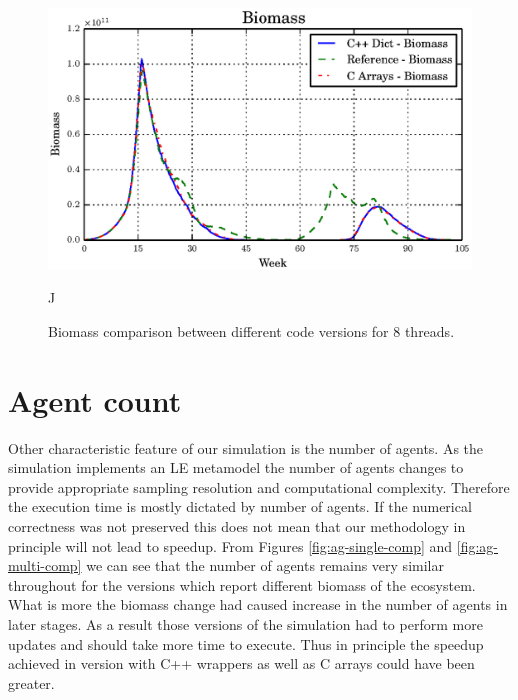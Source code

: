 \documentclass[12pt, a4paper]{report}
\begin{document}
\begin{figure}[H]
  \begin{center}
    \includegraphics[width=\columnwidth]{graphs/bio-multi-comp.eps}
    \caption{Biomass comparison between different code versions for 8 threads.}J
    \label{fig:bio-multi-comp}
  \end{center}
\end{figure}

\section{Agent count}\label{subsec:model-correct-agent}
Other characteristic feature of our simulation is the number of agents. As the
simulation implements an LE metamodel the number of agents changes to provide
appropriate sampling resolution and computational complexity. Therefore the
execution time is mostly dictated by number of agents. If the numerical
correctness was not preserved this does not mean that our methodology in
principle will not lead to speedup. From Figures \ref{fig:ag-single-comp} and
\ref{fig:ag-multi-comp} we can see that the number of agents remains very
similar throughout for the versions which report different biomass of the
ecosystem. What is more the biomass change had caused increase in the number
of agents in later stages. As a result those versions of the simulation had
to perform more updates and should take more time to execute. Thus in principle
the speedup achieved in version with C++ wrappers as well as C arrays could have
been greater.
\end{document}
